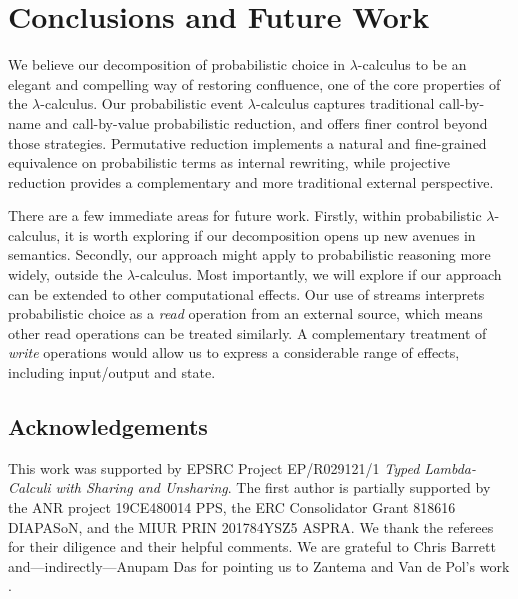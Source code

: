 \documentclass[runningheads,orivec]{llncs}
\makeatletter
\theoremstyle{definition}
\theoremstyle{plain}
\newcommand{\ie}{\textit{i.e.}}
\newcommand\smallbin[1]{\mathchoice
      {\mathbin{\raise.2ex \hbox{$\scriptstyle      #1$}}}%
      {\mathbin{\raise.2ex \hbox{$\scriptstyle      #1$}}}%
      {\mathbin{\raise.12ex\hbox{$\scriptscriptstyle#1$}}}%
      {\mathbin{           \hbox{$\scriptscriptstyle#1$}}}}%
\newcommand\Con{\wedge}
\newcommand\Imp{\rightarrow}
\newcommand\con{\kern1pt{\smallbin\Con}\kern1pt}
\newcommand\imp{\kern1pt{\smallbin\Imp}}
\newcommand\black{\color{black}}
\newcommand\type@next[1]{%
  \ifx#1,\let\type@loop\type@end\else%
  \ifx#1_\let\type@loop\type@sub\else%
  \ifx#1^\let\type@loop\type@sup\else%
  \ifx#1*\con\else%
  \ifx#1-\kern1pt{\imp}\else%
  #1%
  \fi\fi\fi\fi\fi%
  \type@loop%
}
\newcommand\type@sup@color{}
\newcommand\type@sub[1]{_{#1}\let\type@loop\type@next\type@loop}
\newcommand\type@sup[1]{^{{\type@sup@color #1}}\let\type@loop\type@next\type@loop}
\newcommand\type@end{\let\type@sup@color\relax}
\newcommand\x{\lambda x}
\newcommand\y{\lambda y}
\newcommand\z{\lambda z}
\newcommand\+[1][{}]{\kern1pt{\smallbin\oplus}_{#1}\kern1pt}
\newcommand\1{\bullet}
\newcommand\0{\circ}
\newcommand\trm[1]{%
  \vphantom(%
  \let\term@loop=\term@next%
  \term@loop#1,%
}
\newcommand\term@next[1]{%
  \ifx#1,\let\term@loop\term@end\else%
  \ifx#1:\black\colon\term@typecolor\let\term@loop\term@type\else%
  \ifx#1_\let\term@loop\term@sub\else%
  \ifx#1^\let\term@loop\term@sup\else%
  \ifx#1!\let\term@loop\term@box\else%
  \ifx#1+\let\term@loop\term@prob\else%
  \ifx#1*^\1\else%
  \ifx#1o_\1\else%
  \ifx#1p_\perm\else%
  \ifx#1q_{\1\perm}\else%
  \ifx#1i{\kern1pt}^i\else
  \ifx#1v\plusval\else%
  \ifx#1<\lfloor\else%
  \ifx#1>\rfloor\else%
  \ifx#1..\,\else%
  \ifx#1=\kern1pt{\smallbin=}\kern1pt\else
  #1%
  \fi\fi\fi\fi\fi\fi\fi\fi\fi\fi\fi\fi\fi\fi\fi\fi%
  \term@loop%
}
\newcommand\term@typecolor{}
\newcommand\term@end{\let\term@typecolor\relax}
\newcommand\term@sub[1]{_{#1}\let\term@loop\term@next\term@loop}
\newcommand\term@sup[1]{^{#1}\let\term@loop\term@next\term@loop}
\newcommand\term@val[1]{\kern1pt\raisebox{-.5pt}{$\overset{\raisebox{-1pt}{$\scriptstyle#1$}}{{\smallbin\oplus_{\makebox[0pt][l]{$\scriptstyle\val$}}}}$}\kern5pt\let\term@loop\term@next\term@loop}
\newcommand\term@prob[1]{\kern1pt\raisebox{-.5pt}{$\overset{\raisebox{-1pt}{$\scriptstyle#1$}}{{\smallbin\oplus}}$}\kern1pt\let\term@loop\term@next\term@loop}
\newcommand\term@type{\let\type@loop=\type@next\type@loop}
\newcommand\term@box[1]{\probox{#1}\let\term@loop\term@next\term@loop}
\newcommand\probox[1]{\begin{tikzpicture}[baseline=0]\node[anchor=base](a){$\scriptstyle #1\vphantom)$};\draw[line width=.6pt] (-5pt,-2.5pt) rectangle (5pt,7.5pt);\end{tikzpicture}}
\newcommand\rw[1][{}]{\stackrel{#1}\rightsquigarrow}
\newcommand\perm{\mathsf p}
\newcommand\proj[3]{\pi^{#1}_{#2}(\trm{#3})}
\newcommand\val{\mathsf{v}}
\newcommand\plusval{\mathbin{\smallbin\oplus_\val}}
\renewcommand\rw{\mathrel{\tikz\draw[rw](0,0)--(10pt,0pt);}}
\newcommand\rws{\mathrel{\tikz\draw[rws](0,0)--(10pt,0pt);}}
\makeatother
\begin{document}
%

\section{Conclusions and Future Work}

We believe our decomposition of probabilistic choice in $\lambda$-calculus to be an elegant and compelling way of restoring confluence, one of the core properties of the $\lambda$-calculus. Our probabilistic event $\lambda$-calculus captures traditional call-by-name and call-by-value probabilistic reduction, and offers finer control beyond those strategies. Permutative reduction implements a natural and fine-grained equivalence on probabilistic terms as internal rewriting, while projective reduction provides a complementary and more traditional external perspective.

There are a few immediate areas for future work. Firstly, within probabilistic $\lambda$-calculus, it is worth exploring if our decomposition opens up new avenues in semantics. Secondly, our approach might apply to probabilistic reasoning more widely, outside the $\lambda$-calculus. Most importantly, we will explore if our approach can be extended to other computational effects. Our use of streams interprets probabilistic choice as a \emph{read} operation from an external source, which means other read operations can be treated similarly. A complementary treatment of \emph{write} operations would allow us to express a considerable range of effects, including input/output and state.

\subsection*{Acknowledgements}

This work was supported by EPSRC Project EP/R029121/1 \emph{Typed Lambda-Calculi with Sharing and Unsharing}.
The first author is partially supported by the ANR project 19CE480014 PPS, the ERC Consolidator Grant 
818616 DIAPASoN, and the MIUR PRIN 201784YSZ5 ASPRA.
We thank the referees for their diligence and their helpful comments. 
We are grateful to Chris Barrett and---indirectly---Anupam Das for pointing us to Zantema and Van de Pol's work \cite{Zantema-Pol-2001}.
\end{document}
